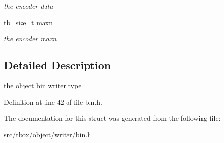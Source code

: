 \begin{DoxyCompactItemize}
\begin{DoxyCompactList}\small\item\em the encoder data \end{DoxyCompactList}\item 
\hypertarget{structtb__object__bin__writer__t_a83b83348763020a580f89772104434ab}{tb\-\_\-size\-\_\-t \hyperlink{structtb__object__bin__writer__t_a83b83348763020a580f89772104434ab}{maxn}}\label{structtb__object__bin__writer__t_a83b83348763020a580f89772104434ab}

\begin{DoxyCompactList}\small\item\em the encoder maxn \end{DoxyCompactList}\end{DoxyCompactItemize}


\subsection{Detailed Description}
the object bin writer type 

Definition at line 42 of file bin.\-h.



The documentation for this struct was generated from the following file\-:\begin{DoxyCompactItemize}
\item 
src/tbox/object/writer/bin.\-h\end{DoxyCompactItemize}
